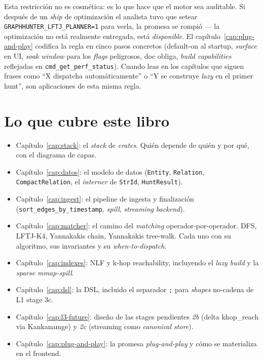 Esta restricción no es cosmética: es lo que hace que el motor sea
auditable. Si después de un \emph{ship} de optimización el analista
tuvo que setear \texttt{GRAPHHUNTER\_LFTJ\_PLANNER=1} para verla,
la promesa se rompió --- la optimización no está realmente
entregada, está \emph{disponible}. El capítulo~\ref{cap:plug-and-play}
codifica la regla en cinco pasos concretos (default-on al startup,
\emph{surface} en UI, \emph{soak window} para los \emph{flags}
peligrosos, doc obliga, \emph{build capabilities} reflejadas en
\texttt{cmd\_get\_perf\_status}). Cuando leas en los capítulos que
siguen frases como ``X dispatcha automáticamente'' o ``Y se
construye \emph{lazy} en el primer hunt'', son aplicaciones de
esta misma regla.

\section{Lo que cubre este libro}

\begin{itemize}
    \item Capítulo~\ref{cap:stack}: el \emph{stack} de \emph{crates}.
    Quién depende de quién y por qué, con el diagrama de capas.
    \item Capítulo~\ref{cap:datos}: el modelo de datos
    (\texttt{Entity}, \texttt{Relation}, \texttt{CompactRelation},
    el \emph{interner} de \texttt{StrId}, \texttt{HuntResult}).
    \item Capítulo~\ref{cap:ingest}: el pipeline de ingesta y
    finalización (\texttt{sort\_edges\_by\_timestamp}, \emph{spill},
    \emph{streaming backend}).
    \item Capítulo~\ref{cap:matcher}: el camino del \emph{matching}
    operador-por-operador. DFS, LFTJ-K4, Yannakakis chain,
    Yannakakis tree-walk. Cada uno con su algoritmo, sus
    invariantes y su \emph{when-to-dispatch}.
    \item Capítulo~\ref{cap:indexes}: NLF y k-hop reachability,
    incluyendo el \emph{lazy build} y la \emph{sparse mmap-spill}.
    \item Capítulo~\ref{cap:dsl}: la DSL, incluido el separador
    \texttt{;} para \emph{shapes} no-cadena de L1 stage 3c.
    \item Capítulo~\ref{cap:l3-future}: diseño de las stages
    pendientes \emph{2b} (delta khop\_reach via Kankanamge) y
    \emph{2c} (streaming como \emph{canonical store}).
    \item Capítulo~\ref{cap:plug-and-play}: la promesa
    \emph{plug-and-play} y cómo se materializa en el frontend.
\end{itemize}
